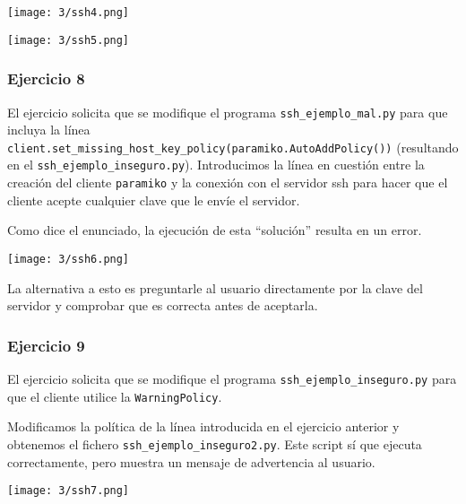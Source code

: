 \begin{minipage}{\linewidth}
    \centering
    \texttt{[image: 3/ssh4.png]}
    \label{fig:3/9}
\end{minipage}

\begin{minipage}{\linewidth}
    \centering
    \texttt{[image: 3/ssh5.png]}
    \label{fig:3/10}
\end{minipage}

\subsubsection{Ejercicio 8}
El ejercicio solicita que se modifique el programa \Verb#ssh_ejemplo_mal.py#
para que incluya la línea \Verb#client.set_missing_host_key_policy(paramiko.AutoAddPolicy())#
(resultando en el \Verb#ssh_ejemplo_inseguro.py#). Introducimos la línea en cuestión entre la
creación del cliente \Verb#paramiko# y la conexión con el servidor ssh para hacer que el cliente
acepte cualquier clave que le envíe el servidor.

Como dice el enunciado, la ejecución de esta ``solución'' resulta en un error.

\begin{minipage}{\linewidth}
    \centering
    \texttt{[image: 3/ssh6.png]}
    \label{fig:3/11}
\end{minipage}

La alternativa a esto es preguntarle al usuario directamente por la clave del servidor
y comprobar que es correcta antes de aceptarla.

\subsubsection{Ejercicio 9}
El ejercicio solicita que se modifique el programa \Verb#ssh_ejemplo_inseguro.py#
para que el cliente utilice la \Verb#WarningPolicy#.

Modificamos la política de la línea introducida en el ejercicio anterior y
obtenemos el fichero \Verb#ssh_ejemplo_inseguro2.py#. Este script sí que ejecuta
correctamente, pero muestra un mensaje de advertencia al usuario.

\begin{minipage}{\linewidth}
    \centering
    \texttt{[image: 3/ssh7.png]}
    \label{fig:3/12}
\end{minipage}

